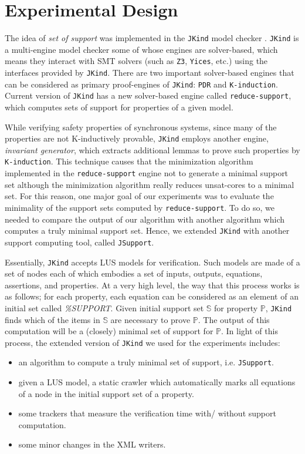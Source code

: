 \section{Experimental Design}
\label{sec:exprm}
The idea of \emph{set of support} \cite{setofsupp} was implemented in the \texttt{JKind} model checker \cite{jkind}.
\texttt{JKind} is a multi-engine model checker some of whose engines are solver-based,
which means they interact with SMT solvers (such as \texttt{Z3}, \texttt{Yices}, etc.) using the interfaces provided by \texttt{JKind}. There are two important solver-based engines that can be considered as primary proof-engines of \texttt{JKind}: \texttt{PDR} and \texttt{K-induction}. Current version of \texttt{JKind} has a new solver-based engine called \texttt{reduce-support}, which computes sets of support for properties of a given model.

While verifying safety properties of synchronous systems, since many of the properties are not K-inductively provable, \texttt{JKind} employs another engine, \emph{invariant generator},
which extracts additional lemmas to prove such properties by \texttt{K-induction}. 
This technique causes that the minimization algorithm implemented in the \texttt{reduce-support} engine not to generate a minimal support set although the minimization algorithm really reduces unsat-cores to a minimal set.
For this reason, 
one major goal of our experiments was to evaluate the minimality of the support sets computed by \texttt{reduce-support}. 
To do so, we needed to compare the output of our algorithm with another algorithm 
which computes a truly minimal support set. Hence, we extended \texttt{JKind} 
with another support computing tool, called \texttt{JSupport}.

 Essentially, \texttt{JKind} accepts LUS models for verification. 
 Such models are made of a set of nodes each of which embodies a set of inputs, outputs, equations, assertions, and properties. At a very high level, the way that this process works is as follows; for each property, each equation can be considered as an element of an initial set called \textit{\%SUPPORT}. Given initial support set $\mathbb{S}$ for property $\mathbb{P}$, \texttt{JKind} finds which of the items in $\mathbb{S}$ are necessary to prove $\mathbb{P}$. The output of this computation will be a (closely) minimal set of support for $\mathbb{P}$. In light of this process, the extended version of \texttt{JKind} we used for the experiments includes:
 
\begin{itemize}
    \item an algorithm to compute a truly minimal set of support, i.e. \texttt{JSupport}.
    \item given a LUS model, a static crawler which automatically marks all equations of a node in the initial support set of a property.
    \item some trackers that measure the verification time with/ without support computation.
    \item some minor changes in the XML writers.
\end{itemize}

